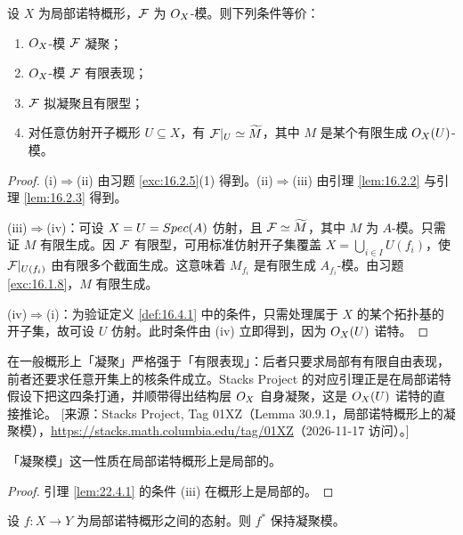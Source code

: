 \begin{lemma}\label{lem:22.4.1}
设 $X$ 为局部诺特概形，$\mathcal{F}$ 为 $O_X$-模。则下列条件等价：
\begin{enumerate}[label=(\roman*),leftmargin=2em,itemsep=0.25ex]
  \item $O_X$-模 $\mathcal{F}$ 凝聚；
  \item $O_X$-模 $\mathcal{F}$ 有限表现；
  \item $\mathcal{F}$ 拟凝聚且有限型；
  \item 对任意仿射开子概形 $U \subseteq X$，有 $\mathcal{F}|_U \simeq \widetilde M$，其中 $M$ 是某个有限生成 $O_X(U)$-模。
\end{enumerate}
\end{lemma}

\begin{proof}
(i)$\Rightarrow$(ii) 由习题 \ref{exc:16.2.5}(1) 得到。(ii)$\Rightarrow$(iii) 由引理 \ref{lem:16.2.2} 与引理 \ref{lem:16.2.3} 得到。

(iii)$\Rightarrow$(iv)：可设 $X = U = Spec(A)$ 仿射，且 $\mathcal{F} \simeq \widetilde M$，其中 $M$ 为 $A$-模。只需证 $M$ 有限生成。因 $\mathcal{F}$ 有限型，可用标准仿射开子集覆盖 $X = \bigcup_{i \in I} U(f_i)$，使 $\mathcal{F}|_{U(f_i)}$ 由有限多个截面生成。这意味着 $M_{f_i}$ 是有限生成 $A_{f_i}$-模。由习题 \ref{exc:16.1.8}，$M$ 有限生成。

(iv)$\Rightarrow$(i)：为验证定义 \ref{def:16.4.1} 中的条件，只需处理属于 $X$ 的某个拓扑基的开子集，故可设 $U$ 仿射。此时条件由 (iv) 立即得到，因为 $O_X(U)$ 诺特。
\end{proof}

\begin{yizhu}
在一般概形上「凝聚」严格强于「有限表现」：后者只要求局部有有限自由表现，前者还要求任意开集上的核条件成立。Stacks Project 的对应引理正是在局部诺特假设下把这四条打通，并顺带得出结构层 $O_X$ 自身凝聚，这是 $O_X(U)$ 诺特的直接推论。
[来源：Stacks Project, Tag 01XZ（Lemma 30.9.1，局部诺特概形上的凝聚模），\url{https://stacks.math.columbia.edu/tag/01XZ}（2026-11-17 访问）。]
\end{yizhu}

\begin{corollary}\label{cor:22.4.2}
「凝聚模」这一性质在局部诺特概形上是局部的。
\end{corollary}

\begin{proof}
引理 \ref{lem:22.4.1} 的条件 (iii) 在概形上是局部的。
\end{proof}

\begin{corollary}\label{cor:22.4.3}
设 $f\colon X \to Y$ 为局部诺特概形之间的态射。则 $f^*$ 保持凝聚模。
\end{corollary}

